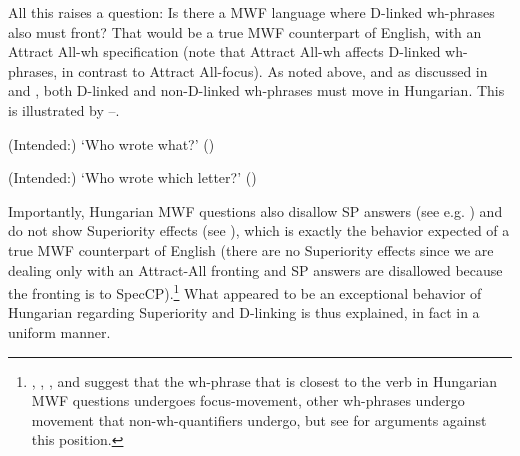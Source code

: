 \documentclass[output=paper,colorlinks,citecolor=brown]{langscibook}
\begin{document}
\noindent All this raises a question: Is there a MWF language where D-linked wh-phrases also must front? That would be a true MWF counterpart of English, with an Attract All-wh specification (note that Attract All-wh affects D-linked wh-phrases, in contrast to Attract All-focus). As noted above, and as discussed in \citet{Bošković2007} and \citet{É.Kiss2002}, both D-linked and non-D-linked wh-phrases must move in Hungarian. This is illustrated by --.

\ea\label{ex:bosk:33A}
\z 
(Intended:) `Who wrote what?' \hfill (\citealt{Bošković2007})
\z 

\ea\label{ex:bosk:33B}
\z 
(Intended:) `Who wrote which letter?' \hfill (\citealt{Bošković2007})
\z 

\noindent Importantly, Hungarian MWF questions also disallow SP answers (see e.g. \citealt{Surányi2005}) and do not show Superiority effects (see ), which is exactly the behavior expected of a true MWF counterpart of English (there are no Superiority effects since we are dealing only with an Attract-All fronting and SP answers are disallowed because the fronting is to SpecCP).\footnote{\citet{Horváth1998}, \citet{Puskás2000}, \citet{Lipták2001}, and \citet{É.Kiss2002} suggest that the wh-phrase that is closest to the verb in Hungarian MWF questions undergoes focus-movement, other wh-phrases undergo movement that non-wh-quantifiers undergo, but see \citet{Surányi2005} for arguments against this position.} What appeared to be an exceptional behavior of Hungarian regarding Superiority and D-linking is thus explained, in fact in a uniform manner.
\end{document}
